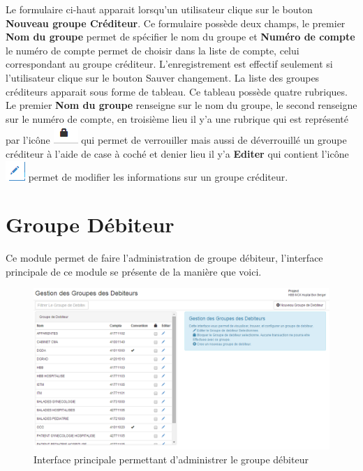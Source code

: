 \documentclass[12pt,a4paper]{report}
\begin{document}
Le formulaire ci-haut apparait lorsqu'un utilisateur clique sur le bouton \textbf{Nouveau groupe Créditeur}. Ce formulaire possède deux champs, le premier \textbf{Nom du groupe} permet de spécifier le nom du groupe et \textbf{Numéro de compte}  le numéro de compte permet de choisir dans la liste de compte, celui correspondant au groupe créditeur.
L'enregistrement est effectif seulement si l'utilisateur clique sur le bouton Sauver changement.
La liste des groupes créditeurs apparait sous forme de tableau. Ce tableau possède quatre rubriques. Le premier \textbf{Nom du groupe} renseigne sur le nom du groupe, le second renseigne sur le numéro de compte, en troisième lieu il y'a une rubrique qui est représenté par l'icône \includegraphics[scale=0.7]{pic/Locked.png}  qui permet de verrouiller mais aussi de déverrouillé un groupe créditeur à l'aide de case à coché et denier lieu il y'a \textbf{Editer} qui contient l'icône  \includegraphics[scale=0.7]{pic/EditUser.png} permet de modifier les informations sur un groupe créditeur.

\section{Groupe Débiteur}
Ce module permet de faire l'administration de groupe débiteur, l'interface principale de ce module se présente de la manière que voici.

\begin{figure}[h]
\begin{center}
\includegraphics[width=14cm]{pic/AdminGroupDebit.png}
\end{center}
\caption{Interface principale permettant d'administrer le groupe débiteur}
\label{Interface principale permettant d'administrer le groupe débiteur}
\end{figure}
\end{document}

